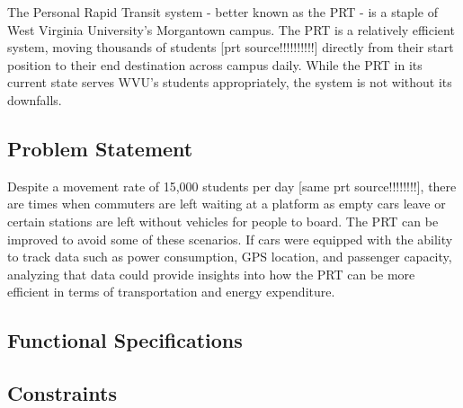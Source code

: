 The Personal Rapid Transit system - better known as the PRT - is a staple of West Virginia University’s Morgantown campus. The PRT is a relatively efficient system, moving thousands of students [prt source!!!!!!!!!!] directly from their start position to their end destination across campus daily. While the PRT in its current state serves WVU’s students appropriately, the system is not without its downfalls.

\subsection{Problem Statement}
Despite a movement rate of 15,000 students per day [same prt source!!!!!!!!], there are times when commuters are left waiting at a platform as empty cars leave or certain stations are left without vehicles for people to board. The PRT can be improved to avoid some of these scenarios. If cars were equipped with the ability to track data such as power consumption, GPS location, and passenger capacity, analyzing that data could provide insights into how the PRT can be more efficient in terms of transportation and energy expenditure.

\subsection{Functional Specifications}

\subsection{Constraints}